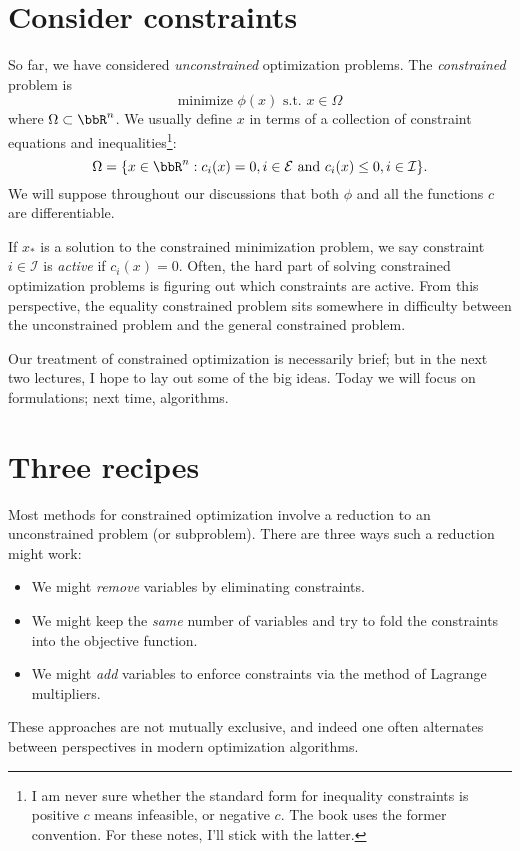 \documentclass[12pt, leqno]{article} %
\begin{document}

\section*{Consider constraints}

So far, we have considered {\em unconstrained} optimization problems.
The {\em constrained} problem is
\[
  \mbox{minimize } \phi(x) \mbox{ s.t. } x \in \Omega
\]
where $\Omega \subset \bbR^n$.  We usually define $x$ in terms
of a collection of constraint equations and inequalities\footnote{
  I am never sure whether the standard form for inequality constraints
  is positive $c$ means infeasible, or negative $c$.  The book uses
  the former convention.  For these notes, I'll stick with the latter.
}:
\[
\Omega = \{ x \in \bbR^n :
  c_i(x) = 0, i \in \mathcal{E} \mbox{ and }
  c_i(x) \leq 0, i \in \mathcal{I} \}.
\]
We will suppose throughout our discussions that both
$\phi$ and all the functions $c$ are differentiable.

If $x_*$ is a solution to the constrained minimization problem, we say
constraint $i \in \mathcal{I}$ is {\em active} if $c_i(x) = 0$.
Often, the hard part of solving constrained optimization problems is
figuring out which constraints are active.  From this perspective, the
equality constrained problem sits somewhere in difficulty between the
unconstrained problem and the general constrained problem.

Our treatment of constrained optimization is necessarily brief;
but in the next two lectures, I hope to lay out some of the big
ideas.  Today we will focus on formulations; next time, algorithms.

\section*{Three recipes}

Most methods for constrained optimization involve a reduction to
an unconstrained problem (or subproblem).  There are three ways
such a reduction might work:
\begin{itemize}
\item We might {\em remove} variables by eliminating constraints.
\item We might keep the {\em same} number of variables and try to fold
  the constraints into the objective function.
\item We might {\em add} variables to enforce constraints via
  the method of Lagrange multipliers.
\end{itemize}
These approaches are not mutually exclusive, and indeed one often
alternates between perspectives in modern optimization algorithms.
\end{document}
